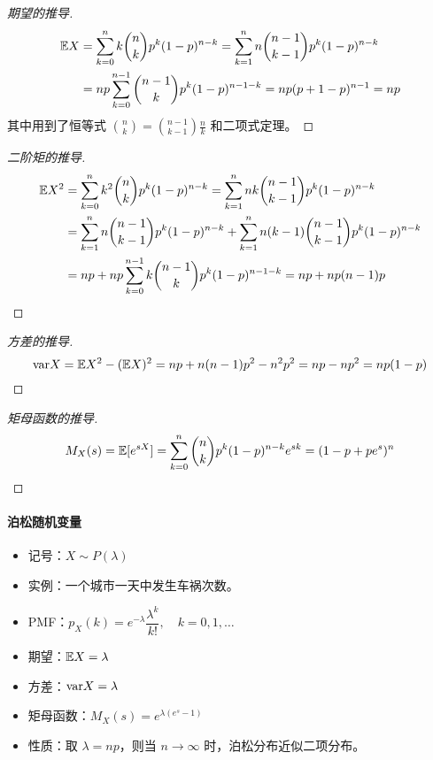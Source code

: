 \begin{proof}[期望的推导]
\begin{align*}
\mathbb{E} X&=\sum_{k=0}^{n}k\binom{n}{k}p^k(1-p)^{n-k}=\sum_{k=1}^nn\binom{n-1}{k-1}p^k(1-p)^{n-k}\\
&=np\sum_{k=0}^{n-1}\binom{n-1}{k}p^k(1-p)^{n-1-k}=np(p+1-p)^{n-1}=np
\end{align*}
其中用到了恒等式 $\displaystyle\binom{n}{k}=\binom{n-1}{k-1}\frac{n}{k}$ 和二项式定理。
\end{proof}
\begin{proof}[二阶矩的推导]
\begin{align*}
\mathbb{E} X^2&=\sum_{k=0}^{n}k^2\binom{n}{k}p^k(1-p)^{n-k}=\sum_{k=1}^nnk\binom{n-1}{k-1}p^k(1-p)^{n-k}\\
&=\sum_{k=1}^nn\binom{n-1}{k-1}p^k(1-p)^{n-k}+\sum_{k=1}^nn(k-1)\binom{n-1}{k-1}p^k(1-p)^{n-k}\\
&=np+np\sum_{k=0}^{n-1}k\binom{n-1}{k}p^{k}(1-p)^{n-1-k}=np+np(n-1)p
\end{align*}
\end{proof}
\begin{proof}[方差的推导]
\[
\mathrm{var} X=\mathbb{E} X^2-(\mathbb{E} X)^2=np+n(n-1)p^2-n^2p^2=np-np^2=np(1-p)
\]
\end{proof}
\begin{proof}[矩母函数的推导]
\[
M_X(s)=\mathbb{E}[e^{sX}]=\sum_{k=0}^n\binom{n}{k}p^k(1-p)^{n-k}e^{sk}=(1-p+pe^s)^n
\]
\end{proof}

\paragraph{泊松随机变量}

\begin{itemize}[itemsep=1ex]
    \item 记号：$X\sim P(\lambda)$
    \item 实例：一个城市一天中发生车祸次数。
    \item PMF：$p_X(k)=e^{-\lambda}\dfrac{\lambda^k}{k!},\quad k=0,1,\ldots$
    \item 期望：$\mathbb{E} X=\lambda$
    \item 方差：$\mathrm{var} X=\lambda$
    \item 矩母函数：$M_X(s)=e^{\lambda(e^s-1)}$
    \item 性质：取 $\lambda=np$，则当 $n\to\infty$ 时，泊松分布近似二项分布。
\end{itemize}

